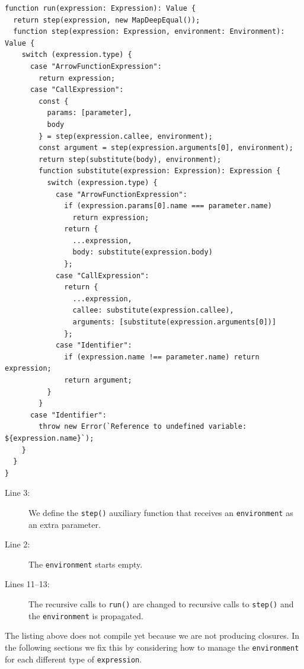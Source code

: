 \documentclass[12pt, oneside]{book}
\begin{document}
\begin{verbatim}
function run(expression: Expression): Value {
  return step(expression, new MapDeepEqual());
  function step(expression: Expression, environment: Environment): Value {
    switch (expression.type) {
      case "ArrowFunctionExpression":
        return expression;
      case "CallExpression":
        const {
          params: [parameter],
          body
        } = step(expression.callee, environment);
        const argument = step(expression.arguments[0], environment);
        return step(substitute(body), environment);
        function substitute(expression: Expression): Expression {
          switch (expression.type) {
            case "ArrowFunctionExpression":
              if (expression.params[0].name === parameter.name)
                return expression;
              return {
                ...expression,
                body: substitute(expression.body)
              };
            case "CallExpression":
              return {
                ...expression,
                callee: substitute(expression.callee),
                arguments: [substitute(expression.arguments[0])]
              };
            case "Identifier":
              if (expression.name !== parameter.name) return expression;
              return argument;
          }
        }
      case "Identifier":
        throw new Error(`Reference to undefined variable: ${expression.name}`);
    }
  }
}
\end{verbatim}

\begin{description}
\item [Line 3:] We define the \texttt{step()} auxiliary function that receives an \texttt{environment} as an extra parameter.

\item [Line 2:] The \texttt{environment} starts empty.

\item [Lines 11–13:] The recursive calls to \texttt{run()} are changed to recursive calls to \texttt{step()} and the \texttt{environment} is propagated.
\end{description}

The listing above does not compile yet because we are not producing closures. In the following sections we fix this by considering how to manage the \texttt{environment} for each different type of \texttt{expression}.
\end{document}
